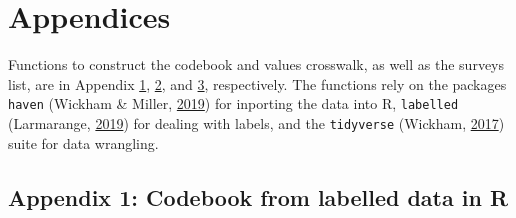 \documentclass[12pt,]{article}
\begin{document}
\hypertarget{appendices}{%
\section{Appendices}\label{appendices}}

Functions to construct the codebook and values crosswalk, as well as the surveys list, are in Appendix \protect\hyperlink{appendix1}{1}, \protect\hyperlink{appendix2}{2}, and \protect\hyperlink{appendix3}{3}, respectively. The functions rely on the packages \texttt{haven} (Wickham \& Miller, \protect\hyperlink{ref-haven}{2019}) for inporting the data into R, \texttt{labelled} (Larmarange, \protect\hyperlink{ref-labelled}{2019}) for dealing with labels, and the \texttt{tidyverse} (Wickham, \protect\hyperlink{ref-tidyverse}{2017}) suite for data wrangling.

\hypertarget{appendix1}{%
\subsection{Appendix 1: Codebook from labelled data in R}\label{appendix1}}

\scriptsize
\end{document}

